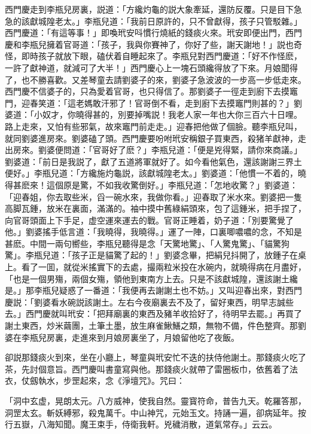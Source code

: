 西門慶走到李瓶兒房裏，説道：「方纔灼龜的説大象牽延，還防反覆。只是目下急急的該獻城隍老太。」李瓶兒道：「我前日原許的，只不曾獻得，孩子只管駁雜。」西門慶道：「有這等事！」即喚玳安呌慣行燒紙的錢痰火來。玳安即便出門，西門慶和李瓶兒擁着官哥道：「孩子，我與你賽神了，你好了些，謝天謝地！」説也奇怪，即時孩子就放下眼，磕伏着自睡起來了。李瓶兒對西門慶道：「好不作怪麽，一許了獻神道，就減可了大半！」西門慶心上一塊石頭纔得放了下來。月娘聞得了，也不勝喜歡。又差琴童去請劉婆子的來，劉婆子急波波的一步高一步低走來。西門慶不信婆子的，只為愛着官哥，也只得信了。那劉婆子一徑走到廚下去摸竈門，迎春笑道：「這老媽敢汗邪了！官哥倒不看，走到廚下去摸竈門則甚的？」劉婆道：「小奴才，你曉得甚的，別要掉嘴説！我老人家一年也大你三百六十日哩。路上走來，又怕有些邪氣，故來竈門前走走。」迎春把他做了個臉。聽李瓶兒叫，就同劉婆進房來。劉婆磕了頭。西門慶要吩咐玳安稱銀子買東西，殺猪羊獻神，走出房來。劉婆便問道：「官哥好了麽？」李瓶兒道：「便是兇得緊，請你來商議。」劉婆道：「前日是我説了，獻了五道將軍就好了。如今看他氣色，還該謝謝三界土便好。」李瓶兒道：「方纔施灼龜説，該獻城隍老太。」劉婆道：「他慣一不着的，曉得甚麽來！這個原是驚，不如我收驚倒好。」李瓶兒道：「怎地收驚？」劉婆道：「迎春姐，你去取些米，舀一碗水來，我做你看。」迎春取了米水來。劉婆把一隻高脚瓦鍾，放米在裏面，滿滿的。袖中摸中舊綠絹頭來，包了這鍾米，把手捏了，向官哥頭面上下手足，虚空運來運去的戰。官哥正睡着，奶子道：「別要驚覺了他。」劉婆搖手低言道：「我曉得，我曉得。」運了一陣，口裏唧噥噥的念，不知是甚麽。中間一兩句嚮些，李瓶兒聽得是念「天驚地驚」、「人驚鬼驚」、「貓驚狗驚」。李瓶兒道：「孩子正是貓驚了起的！」劉婆念畢，把絹兒抖開了，放鍾子在桌上。看了一囬，就從米搖實下的去處，撮兩粒米投在水碗内，就曉得病在月盡好，「也是一個男殤，兩個女殤，領他到東南方上去。只是不該獻城隍，還該謝土纔是。」那李瓶兒疑惑了一番道：「我便再去謝謝土也不妨。」又叫迎春出來，對西門慶説：「劉婆看水碗説該謝土。左右今夜廟裏去不及了，留好東西，明早志誠些去。」西門慶就叫玳安：「把拜廟裏的東西及豬羊收拾好了，待明早去罷。」再買了謝土東西，炒米繭團，土筆土墨，放生麻雀鰍鱔之類，無物不備，件色整齊。那劉婆在李瓶兒房裏，走進來到月娘房裏坐了，月娘留他吃了夜飯。

卻説那錢痰火到來，坐在小廳上，琴童與玳安忙不迭的扶侍他謝土。那錢痰火吃了茶，先討個意旨。西門慶叫書童寫與他。那錢痰火就帶了雷圈板巾，依舊着了法衣，仗劔執水，步罡起來，念《淨壇咒》。咒曰：

\begin{myquote}
「洞中玄虚，晃朗太元。八方威神，使我自然。靈寳符命，普告九天。乾羅答那，洞罡太玄。斬妖縛邪，殺鬼萬千。中山神咒，元始玉文。持誦一遍，卻病延年。按行五嶽，八海知聞。魔王束手，侍衛我軒。兇穢消散，道氣常存。」云云。
\end{myquote}

